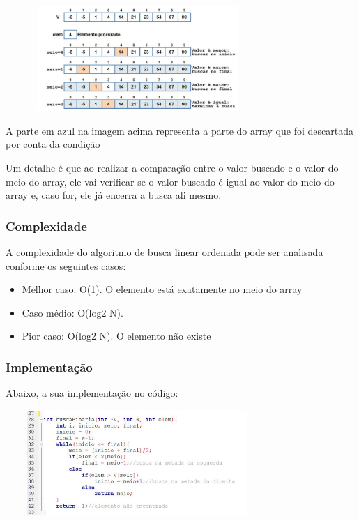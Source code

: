 \documentclass{report}
\begin{document}
	\begin{center}
		
		\includegraphics[width=10cm,height=4cm,keepaspectratio=false]{imagens/bbinaria.png}
		
	\end{center}
	
	A parte em azul na imagem acima representa a parte do array que foi descartada por conta da condição
	
	
	Um detalhe é que ao realizar a comparação entre o valor buscado e o valor do meio do array, ele vai verificar se o valor buscado é igual ao valor do meio do array e, caso for, ele já encerra a busca ali mesmo.
	
	\subsubsection{Complexidade}
	
	A complexidade do algoritmo de busca linear ordenada pode ser analisada conforme os seguintes casos:
	
	\begin{itemize}
		\item Melhor caso: O(1). O elemento está exatamente no meio do array
		\item Caso médio: O(log2 N). 
		\item Pior caso: O(log2 N). O elemento não existe
	\end{itemize}
	
	\subsubsection{Implementação}
	
	Abaixo, a sua implementação no código:
	
	\begin{center}
		
		\includegraphics[width=10cm,height=4cm,keepaspectratio=false]{imagens/bbinariafunc.png}
		
	\end{center}
	
\end{document}
